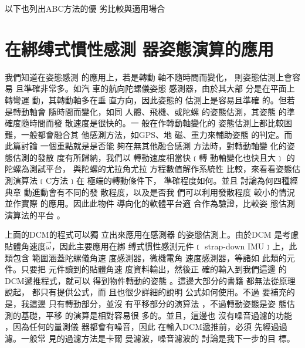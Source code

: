 \documentclass[12pt,twoside]{article}
\begin{document}
以下也列出ABC方法的優%
劣比較與適用場合

%
\begin{center}

\end{center}%

\clearpage%

\part{在綁缚式慣性感測%
器姿態演算的應用}

\setcounter{page}{1}

我們知道在姿態感測%
的應用上，若是轉動%
軸不隨時間而變化，%
則姿態估測上會容易%
且準確非常多。如汽%
車的航向陀螺儀姿態%
感測器，由於其大部%
分是在平面上轉彎運%
動，其轉動軸多在垂%
直方向，因此姿態的%
估測上是容易且準確%
的。但若是轉動軸會%
隨時間而變化，如同%
人體、飛機、或陀螺%
的姿態估測，其姿態%
的準確度隨時間而發%
散速度是很快的。一%
般在作轉動軸變化的%
姿態估測上都比較困%
難，一般都會融合其%
他感測方法，如GPS、地%
磁、重力來輔助姿態%
的判定。而此篇討論%
一個重點就是是否能%
夠在無其他融合感測%
方法時，對轉動軸變%
化的姿態估測的發散%
度有所歸納，我們以%
轉動速度相當快﹝轉%
動軸變化也快且大﹞%
的陀螺為測試平台，%
與陀螺的尤拉角尤拉%
方程數值解作系統性%
比較，來看看姿態估%
測演算法﹝C方法﹞在%
極端的轉動條件下，%
準確程度如何。並且%
討論為何四種經典章%
動進動會有不同的發%
散程度，以及是否我%
們可以利用發散程度%
較小的情況並作實際%
的應用。因此此物件%
導向化的軟體平台適%
合作為驗證，比較姿%
態估測演算法的平台%
。

\bigskip

上面的DCM的程式可以獨%
立出來應用在感測器%
的姿態估測上。由於DCM%
是考慮貼體角速度$\vec{\omega}
$，因此主要應用在綁%
缚式慣性感測元件﹝%
strap-down IMU﹞上，此類包含%
範圍涵蓋陀螺儀角速%
度感測器，微機電角%
速度感測器，等諸如%
此類的元件。只要把%
元件讀到的貼體角速%
度資料輸出，然後正%
確的輸入到我們這邊%
的DCM遞推程式，就可以%
得到物件轉動的姿態%
。這邊大部分的書籍%
都無法從原理說起，%
都只有提供公式，而%
且也很少詳細的說明%
公式如何使用。不過%
要補充的是，我這邊%
只有轉動部分，並沒%
有平移部分的演算法%
，不過轉動姿態是姿%
態估測的基礎，平移%
的演算是相對容易很%
多的。並且，這邊也%
沒有噪音過濾的功能%
，因為任何的量測儀%
器都會有噪音，因此%
在輸入DCM遞推前，必須%
先經過過濾。一般常%
見的過濾方法是卡爾%
曼濾波，噪音濾波的%
討論是我下一步的目%
標。
\end{document}

